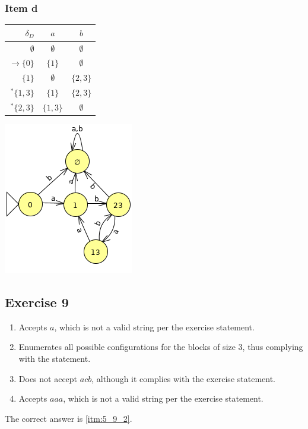 {\subsubsection{Item d}
\begin{center}
\begin{minipage}{0.30\textwidth}
	\begin{center} \begin{tabular}{r | c c}
		$\delta_D           $ & $a        $ & $b        $\\ \hline
		$          \emptyset$ & $\emptyset$ & $\emptyset$\\
		$\rightarrow \{0  \}$ & $\{1    \}$ & $\emptyset$\\
		$            \{1  \}$ & $\emptyset$ & $\{2,3  \}$\\
		$      ^* \{1,3\}$ & $\{1    \}$ & $\{2,3  \}$\\
		$      ^* \{2,3\}$ & $\{1,3  \}$ & $\emptyset$
	\end{tabular} \end{center}
\end{minipage}
\begin{minipage}{0.30\textwidth}
	\begin{center} \includegraphics[scale=0.5]{TP05_8_d} \end{center}
\end{minipage}
\end{center}
\subsection{Exercise 9}
\begin{enumerate}
\item Accepts $a$, which is not a valid string per the exercise statement.
\item \label{itm:5_9_2} Enumerates all possible configurations for the blocks of size 3, thus complying with the statement.
\item Does not accept $acb$, although it complies with the exercise statement.
\item Accepts $aaa$, which is not a valid string per the exercise statement.
\end{enumerate}
The correct answer is \ref{itm:5_9_2}.
\pagebreak
}
